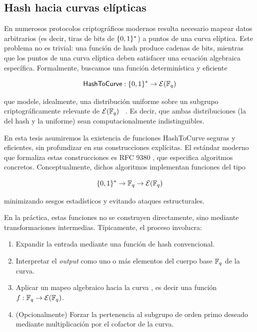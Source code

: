 \subsection{Hash hacia curvas elípticas}
\label{subsec:apendice-a-hashes-hash-hacia-curvas-elipticas}

En numerosos protocolos criptográficos modernos resulta necesario mapear datos arbitrarios (es decir, tiras de bits de $\{0,1\}^{*}$) a puntos de una curva elíptica. Este problema no es trivial: una función de hash produce cadenas de bits, mientras que los puntos de una curva elíptica deben satisfacer una ecuación algebraica específica. Formalmente, buscamos una función determinística y eficiente

$$\textsf{HashToCurve} : \{0,1\}^{*} \to \mathcal{E}(\mathbb{F}_q)$$

que modele, idealmente, una distribución uniforme sobre un subgrupo criptográficamente relevante de $\mathcal{E}(\mathbb{F}_q)$  \cite{Fouque2012, Wahby2019}. Es decir, que ambas distribuciones (la del hash y la uniforme) sean computacionalmente indistinguibles.

En esta tesis asumiremos la existencia de funciones HashToCurve seguras y eficientes, sin profundizar en sus construcciones explícitas. El estándar moderno que formaliza estas construcciones es RFC 9380 \cite{rfc9380}, que especifica algoritmos concretos. Conceptualmente, dichos algoritmos implementan funciones del tipo

$$\{0,1\}^{*} \to \mathbb{F}_q \to \mathcal{E}(\mathbb{F}_q)$$

minimizando sesgos estadísticos \cite{Fouque2012} y evitando ataques estructurales.

En la práctica, estas funciones no se construyen directamente, sino mediante transformaciones intermedias. Típicamente, el proceso involucra:

\begin{enumerate}[noitemsep]
	\item Expandir la entrada mediante una función de hash convencional.
		\item Interpretar el \textit{output} como uno o más elementos del cuerpo base $\mathbb{F}_q$ de la curva.
	\item Aplicar un mapeo algebraico hacia la curva \cite{Wahby2019, cryptoeprint:2013/325}, es decir una función $f: \mathbb{F}_q \to \mathcal{E}(\mathbb{F}_q)$.
	\item (Opcionalmente) Forzar la pertenencia al subgrupo de orden primo deseado mediante multiplicación por el cofactor de la curva.
\end{enumerate}

